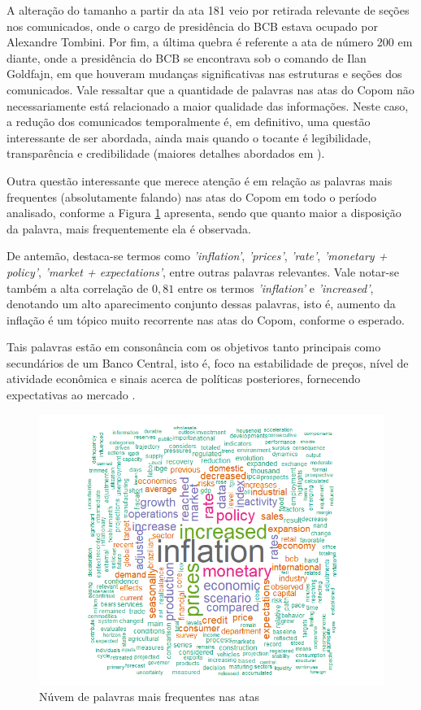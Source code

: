 A alteração do tamanho a partir da ata 181 veio por retirada relevante de seções nos comunicados, onde o cargo de presidência do BCB estava ocupado por Alexandre Tombini. Por fim, a última quebra é referente a ata de número 200 em diante, onde a presidência do BCB se encontrava sob o comando de Ilan Goldfajn, em que houveram mudanças significativas nas estruturas e seções dos comunicados. Vale ressaltar que a quantidade de palavras nas atas do Copom não necessariamente está relacionado a maior qualidade das informações. Neste caso, a redução dos comunicados temporalmente é, em definitivo, uma questão interessante de ser abordada, ainda mais quando o tocante é legibilidade, transparência e credibilidade (maiores detalhes abordados em ).

Outra questão interessante que merece atenção é em relação as palavras mais frequentes (absolutamente falando) nas atas do Copom em todo o período analisado, conforme a Figura \ref{figure:wordcloud} apresenta, sendo que quanto maior a disposição da palavra, mais frequentemente ela é observada. 

De antemão, destaca-se termos como \textit{'inflation'}, \textit{'prices'}, \textit{'rate'}, \textit{'monetary + policy'}, \textit{'market + expectations'}, entre outras palavras relevantes. Vale notar-se também a alta correlação de $0,81$ entre os termos \textit{'inflation'} e \textit{'increased'}, denotando um alto aparecimento conjunto dessas palavras, isto é, aumento da inflação é um tópico muito recorrente nas atas do Copom, conforme o esperado.

Tais palavras estão em consonância com os objetivos tanto principais como secundários de um Banco Central, isto é, foco na estabilidade de preços, nível de atividade econômica e sinais acerca de políticas posteriores, fornecendo expectativas ao mercado \cite{blinder2000central, mishkin2000, bernanke2004monetary}.

\begin{figure}[hbtp]
	\centering
	\caption{Núvem de palavras mais frequentes nas atas} \label{figure:wordcloud}
	\includegraphics[scale = 0.75]{figuras/wordcloud_copom_words.png}
\end{figure}

